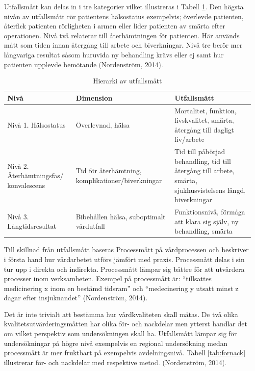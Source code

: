 Utfallsmått kan delas in i tre kategorier vilket illustreras i Tabell \ref{utfallsh}. Den högsta nivån av utfallsmått rör patientens hälsostatus exempelvis; överlevde patienten, återfick patienten rörligheten i armen eller lider patienten av smärta efter operationen. Nivå två relaterar till återhämtningen för patienten. Här används mått som tiden innan återgång till arbete och biverkningar. Nivå tre berör mer långvariga resultat såsom huruvida ny behandling krävs eller ej samt hur patienten upplevde bemötande  (Nordenström, 2014).

\begin{table}[h]
\centering
\caption{Hierarki av utfallsmått}
\label{utfallsh}
\begin{tabular}{|p{3cm}|p{5cm}|p{5cm}|}
\hline
Nivå & Dimension & Utfallsmått \\ \hline
Nivå 1. \newline Hälsostatus & Överlevnad, hälsa & Mortalitet, funktion, livskvalitet, smärta, återgång till dagligt liv/arbete \\ \hline
Nivå 2. \newline Återhämtningsfas/ konvalescens & Tid för återhämtning, komplikationer/biverkningar & Tid till påbörjad behandling, tid till återgång till arbete, smärta, sjukhusvistelsens längd, biverkningar \\ \hline
Nivå 3. \newline Långtidsresultat & Bibehållen hälsa, suboptimalt vårdutfall & Funktionsnivå, förmåga att klara sig själv, ny behandling, smärta \\ \hline
\end{tabular}
\end{table}

Till skillnad från utfallsmått baseras Processmått  på vårdprocessen och beskriver i första hand hur vårdarbetet utförs jämfört med praxis. Processmått delas i sin tur upp i direkta och indirekta. Processmått lämpar sig bättre för att utvärdera processer inom verksamheten. Exempel på processmått är: “tillsattes medicinering x inom en bestämd tidsram” och “medecinering y utsatt minst z dagar efter insjuknandet” (Nordenström, 2014).
 
Det är inte trivialt att bestämma hur vårdkvaliteten skall mätas. De två olika kvalitetsutvärderingsmåtten har olika för- och nackdelar men ytterst handlar det om vilket perspektiv som undersökningen skall ha. Utfallsmått lämpar sig för undersökningar på högre nivå exempelvis en regional undersökning medan processmått är mer fruktbart på exempelvis avdelningsnivå. Tabell \ref{tab:fornack} illustrerar för- och nackdelar med respektive metod. (Nordenström, 2014).

